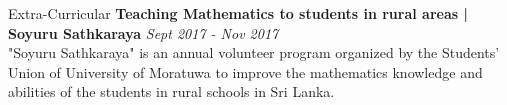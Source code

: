 \documentclass{cv}
\begin{document}

\begin{rSection}{Extra-Curricular}
{\bf Teaching Mathematics to students in rural areas | Soyuru Sathkaraya}       \hfill {\em Sept 2017 - Nov 2017}
\\"Soyuru Sathkaraya" is an annual volunteer program organized by the Students' Union of University of Moratuwa to improve the mathematics knowledge and abilities of the students in rural schools in Sri Lanka.
\end{rSection}

\end{document}
